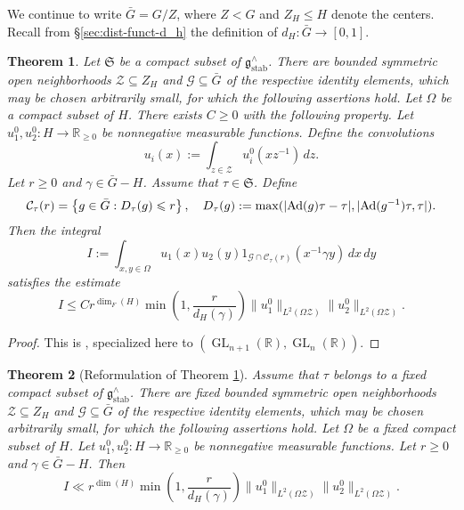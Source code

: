 \documentclass[reqno]{amsart}
\DeclarePairedDelimiter{\paren}{(}{)}
\DeclarePairedDelimiter{\abs}{\lvert}{\rvert}
\DeclareMathOperator{\GL}{GL}
\DeclareMathOperator{\Ad}{Ad}
\DeclareMathOperator{\stab}{stab}
\theoremstyle{plain} \newtheorem{theorem} {Theorem}
\theoremstyle{definition} \newtheorem{definition} [theorem] {Definition}
\theoremstyle{itplain} %
\numberwithin{equation}{section}
\numberwithin{theorem}{section}
\renewcommand{\geq}{\geqslant}
\renewcommand{\leq}{\leqslant}
\begin{document}
We continue to write $\bar{G} = G / Z$, where $Z < G$ and $Z_H \leq H$ denote the centers.  Recall from \S\ref{sec:dist-funct-d_h} the definition of $d_H : \bar{G} \rightarrow [0,1]$.
\begin{theorem}\label{thm:bilinear-forms-cited}
  Let $\mathfrak{S}$ be a compact subset of $\mathfrak{g}^\wedge_{\stab}$.  There are bounded symmetric open neighborhoods $\mathcal{Z} \subseteq Z_H$ and $\mathcal{G} \subseteq \bar{G}$ of the respective identity elements, which may be chosen arbitrarily small, for which the following assertions hold.  Let $\Omega$ be a compact subset of $H$.  There exists $C \geq 0$ with the following property.  Let $u_1 ^0 , u_2 ^0 : H \rightarrow \mathbb{R}_{\geq 0}$ be nonnegative measurable functions.  Define the convolutions
  \begin{equation*}
    u_i(x) := \int _{z \in \mathcal{Z} } u_i ^0 (x z^{-1}) \, d z.
  \end{equation*}
  Let $r \geq 0$ and $\gamma \in \bar{G} - H$.  Assume that $\tau \in \mathfrak{S}$.  Define
  \begin{equation*}
    \mathcal{C}_\tau(r) = \left\{ g \in \bar{G} : D_\tau(g) \leq r \right\},
    \quad 
    D_\tau(g) := \max \paren{ \abs{\Ad \paren{g} \tau-\tau}, \abs{\Ad \paren{g^{-1}} \tau, \tau} }.
  \end{equation*}
  Then the integral
  \begin{equation*}
    I := \int _{x, y \in \Omega } u_1(x) u_2(y) 1_{\mathcal{G} \cap \mathcal{C}_\tau(r)}  (x ^{-1} \gamma y) \,d x \, d y
  \end{equation*}
  satisfies the estimate
  \begin{equation}\label{eq:i-leq-c}
    I \leq C r^{\dim_F(H)} \min \left( 1, \frac{r}{ d_H(\gamma)} \right) \|u_1^0 \|_{L^2(\Omega \mathcal{Z} )} \|u_2^0 \|_{L^2(\Omega \mathcal{Z})}.
  \end{equation}
\end{theorem}
\begin{proof}
  This is \cite[Theorem 15.1]{2020arXiv201202187N}, specialized here to $(\GL_{n+1}(\mathbb{R}), \GL_n(\mathbb{R}))$.
\end{proof}
\begin{theorem}[Reformulation of Theorem \ref{thm:bilinear-forms-cited}]\label{thm:bilinear-forms-reformulated}
  Assume that $\tau$ belongs to a fixed compact subset of $\mathfrak{g}^\wedge_{\stab}$.  There are fixed bounded symmetric open neighborhoods $\mathcal{Z} \subseteq Z_H$ and $\mathcal{G} \subseteq \bar{G}$ of the respective identity elements, which may be chosen arbitrarily small, for which the following assertions hold.  Let $\Omega$ be a fixed compact subset of $H$.  Let $u_1 ^0 , u_2 ^0 : H \rightarrow \mathbb{R}_{\geq 0}$ be nonnegative measurable functions.  Let $r \geq 0$ and $\gamma \in \bar{G} - H$.  Then
  \begin{equation}\label{eq:i-ll-rdim_fh}
    I \ll r^{\dim(H)} \min \left( 1, \frac{r}{ d_H(\gamma)} \right) \|u_1^0 \|_{L^2(\Omega \mathcal{Z} )} \|u_2^0 \|_{L^2(\Omega \mathcal{Z})}.
  \end{equation}
\end{theorem}
\end{document}
